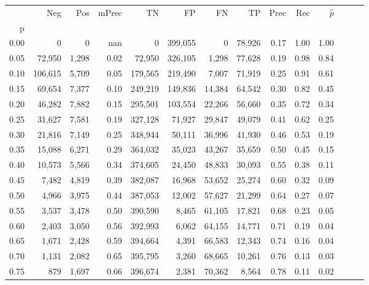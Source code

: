\begin{tabular}{rrrrrrrrrrrrrr}
\toprule
{} &      Neg &    Pos & mPrec &       TN &       FP &      FN &      TP &  Prec &   Rec & $\hat{p}$ \\
p    &          &        &       &          &          &         &         &       &       &           \\
\midrule
0.00 &        0 &      0 &   nan &        0 &  399,055 &       0 &  78,926 &  0.17 &  1.00 &      1.00 \\
0.05 &   72,950 &  1,298 &  0.02 &   72,950 &  326,105 &   1,298 &  77,628 &  0.19 &  0.98 &      0.84 \\
0.10 &  106,615 &  5,709 &  0.05 &  179,565 &  219,490 &   7,007 &  71,919 &  0.25 &  0.91 &      0.61 \\
0.15 &   69,654 &  7,377 &  0.10 &  249,219 &  149,836 &  14,384 &  64,542 &  0.30 &  0.82 &      0.45 \\
0.20 &   46,282 &  7,882 &  0.15 &  295,501 &  103,554 &  22,266 &  56,660 &  0.35 &  0.72 &      0.34 \\
0.25 &   31,627 &  7,581 &  0.19 &  327,128 &   71,927 &  29,847 &  49,079 &  0.41 &  0.62 &      0.25 \\
0.30 &   21,816 &  7,149 &  0.25 &  348,944 &   50,111 &  36,996 &  41,930 &  0.46 &  0.53 &      0.19 \\
0.35 &   15,088 &  6,271 &  0.29 &  364,032 &   35,023 &  43,267 &  35,659 &  0.50 &  0.45 &      0.15 \\
0.40 &   10,573 &  5,566 &  0.34 &  374,605 &   24,450 &  48,833 &  30,093 &  0.55 &  0.38 &      0.11 \\
0.45 &    7,482 &  4,819 &  0.39 &  382,087 &   16,968 &  53,652 &  25,274 &  0.60 &  0.32 &      0.09 \\
0.50 &    4,966 &  3,975 &  0.44 &  387,053 &   12,002 &  57,627 &  21,299 &  0.64 &  0.27 &      0.07 \\
0.55 &    3,537 &  3,478 &  0.50 &  390,590 &    8,465 &  61,105 &  17,821 &  0.68 &  0.23 &      0.05 \\
0.60 &    2,403 &  3,050 &  0.56 &  392,993 &    6,062 &  64,155 &  14,771 &  0.71 &  0.19 &      0.04 \\
0.65 &    1,671 &  2,428 &  0.59 &  394,664 &    4,391 &  66,583 &  12,343 &  0.74 &  0.16 &      0.04 \\
0.70 &    1,131 &  2,082 &  0.65 &  395,795 &    3,260 &  68,665 &  10,261 &  0.76 &  0.13 &      0.03 \\
0.75 &      879 &  1,697 &  0.66 &  396,674 &    2,381 &  70,362 &   8,564 &  0.78 &  0.11 &      0.02 \\

\end{tabular}
